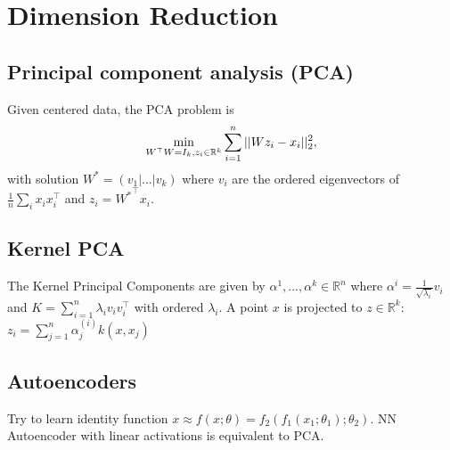 \section*{Dimension Reduction}
\subsection*{Principal component analysis (PCA)}
Given centered data, the PCA problem is 
$$\min_{W^\top W=I_k,z_i\in\mathbb{R}^k}\sum_{i=1}^n||W z_i - x_i||_2^2,$$
with solution $W^* = (v_1|...|v_k)$ where $v_i$ are the ordered 
eigenvectors of $\frac{1}{n}\sum_ix_ix_i^\top$ 
and $z_i = {W^*}^\top x_i$. 

\subsection*{Kernel PCA}
The Kernel Principal Components are given by $\alpha^{1},...,\alpha^{k}\in \mathbb{R}^n$ 
where $\alpha^{i} = \frac{1}{\sqrt{\lambda_i}}v_i$ and 
$K = \sum_{i=1}^n \lambda_i v_i v_i^\top$ with ordered $\lambda_i.$ A point 
$x$ is projected to $z \in \mathbb{R}^k$:
$z_i = \sum_{j=1}^n\alpha_j^{(i)}k(x,x_j)$

\subsection*{Autoencoders}
Try to learn identity function $x \approx f(x;\theta)
= f_2(f_1(x_1;\theta_1);\theta_2)$. NN Autoencoder with 
linear activations is equivalent to PCA.
\\